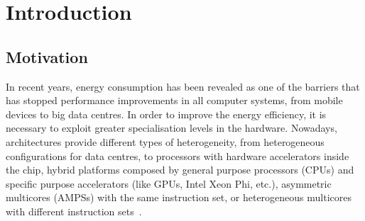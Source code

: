 \cleardoublepage

\chapter*{Introduction}
\label{ch:chapter1}

\section*{Motivation}


In recent years, energy consumption has been revealed as one of the
barriers that has stopped performance improvements in all computer systems,
from mobile devices to big data centres. In order to improve the energy
efficiency, it is necessary to exploit greater specialisation levels in the
hardware. Nowadays, architectures provide different types of heterogeneity,
from heterogeneous configurations for data centres, to processors with
hardware accelerators inside the chip, hybrid platforms composed by general
purpose processors (CPUs) and specific purpose accelerators (like GPUs,
Intel Xeon Phi, etc.), asymmetric multicores (AMPSs) with the same
instruction set, or heterogeneous multicores with different instruction
sets~\cite{NRC2011,KoSh13}.



